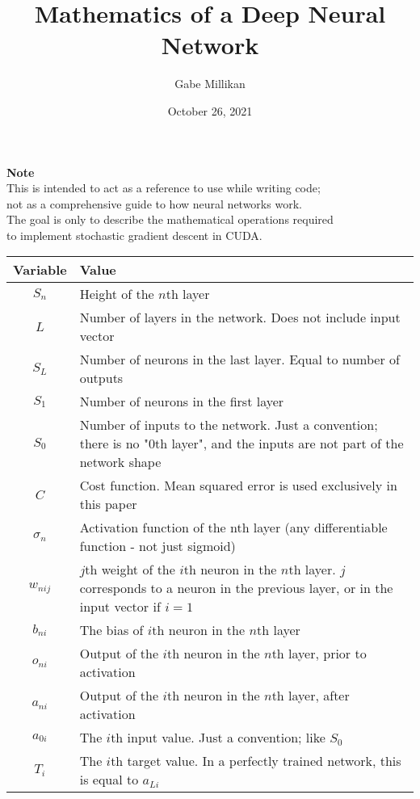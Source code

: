 \documentclass[12pt]{article}
\title{
    Mathematics of a Deep Neural Network
}
\author{
    Gabe Millikan
}
\date{October 26, 2021}
\begin{document}
\maketitle

\begin{center}

    \vspace{2in}
    \textbf{Note} \\
    This is intended to act as a reference to use while writing code; \\
    not as a comprehensive guide to how neural networks work. \\
    The goal is only to describe the mathematical operations required \\
    to implement stochastic gradient descent in CUDA.

\end{center}

\pagebreak
\begin{center}
    \begin{tabularx}{\textwidth}{c|X}
        \textbf{Variable} & \textbf{Value} \\
        \hline
        $ S_{n} $ & Height of the $n$th layer \\
        \hline
        $L$ & Number of layers in the network. Does not include input vector\\
        \hline
        $S_L$ & Number of neurons in the last layer. Equal to number of outputs\\
        \hline
        $S_1$ & Number of neurons in the first layer\\
        \hline
        $S_0$ & Number of inputs to the network. Just a convention; there is no "$0$th layer", and the inputs are not part of the network shape\\
        \hline
        $C$ & Cost function. Mean squared error is used exclusively in this paper \\
        \hline
        $ \sigma_{n} $ & Activation function of the nth layer (any differentiable function - not just sigmoid) \\
        \hline
        $ w_{nij} $ & $j$th weight of the $i$th neuron in the $n$th layer. $j$ corresponds to a neuron in the previous layer, or in the input vector if $i = 1$ \\
        \hline
        $ b_{ni} $ & The bias of $i$th neuron in the $n$th layer \\
        \hline
        $ o_{ni} $ & Output of the $i$th neuron in the $n$th layer, prior to activation \\
        \hline
        $ a_{ni} $ & Output of the $i$th neuron in the $n$th layer, after activation \\
        \hline
        $ a_{0i} $ & The $i$th input value. Just a convention; like $S_0$ \\
        \hline
        $ T_i $ & The $i$th target value. In a perfectly trained network, this is equal to $a_{Li}$ \\
    \end{tabularx}
\end{center}
\end{document}
